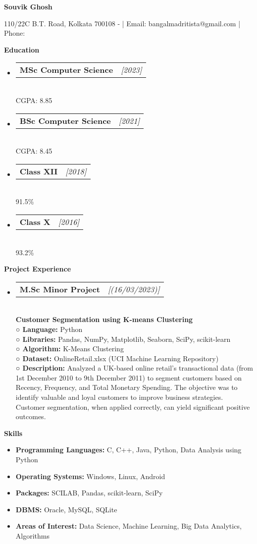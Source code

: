 \documentclass[a4paper,10pt]{article}
\makeatletter
\newcommand{\resitem}[1]{\item #1}
\newcommand{\resheading}[1]{\vspace{0.5em} {\small \colorbox{mygrey}{{\begin{minipage}{0.975\textwidth}{{\textbf{#1}}}\end{minipage}}}} \vspace{0.5em}}
\newcommand{\ressubheading}[3]{\begin{tabular*}{6.62in}{l @{\extracolsep{\fill}} r} \textbf{#1} & \textit{[#2]} \\ \end{tabular*}\vspace{-8pt}}
\makeatother
\begin{document}
\begin{center} \Large{\textbf{Souvik Ghosh}} \end{center}

\vspace{2pt}

\begin{center} 110/22C B.T. Road, Kolkata 700108 - | Email: bangalmadritista@gmail.com | Phone: \end{center}

\resheading{Education}
\begin{itemize}[noitemsep,topsep=0pt]
\resitem{\ressubheading{MSc Computer Science}{2023}{Banaras Hindu University, Varanasi} \\ CGPA: 8.85}
\resitem{\ressubheading{BSc Computer Science}{2021}{Scottish Church College, University of Calcutta, Kolkata} \\ CGPA: 8.45}
\resitem{\ressubheading{Class XII}{2018}{Central Modern School, Council for the Indian School Certificate Examinations} \\ 91.5\%}
\resitem{\ressubheading{Class X}{2016}{Central Modern School, Council for the Indian School Certificate Examinations} \\ 93.2\%}
\end{itemize}

\resheading{Project Experience}
\begin{itemize}[noitemsep,topsep=0pt]
\resitem{\ressubheading{M.Sc Minor Project}{(16/03/2023)}{} \\ \textbf{Customer Segmentation using K-means Clustering} \\ \textbf{○ Language:} Python \\ \textbf{○ Libraries:} Pandas, NumPy, Matplotlib, Seaborn, SciPy, scikit-learn \\ \textbf{○ Algorithm:} K-Means Clustering \\ \textbf{○ Dataset:} OnlineRetail.xlsx (UCI Machine Learning Repository) \\ \textbf{○ Description:} Analyzed a UK-based online retail’s transactional data (from 1st December 2010 to 9th December 2011) to segment customers based on Recency, Frequency, and Total Monetary Spending.  The objective was to identify valuable and loyal customers to improve business strategies.  Customer segmentation, when applied correctly, can yield significant positive outcomes.}
\end{itemize}

\resheading{Skills}
\begin{itemize}[noitemsep,topsep=0pt]
\resitem{\textbf{Programming Languages:} C, C++, Java, Python, Data Analysis using Python}
\resitem{\textbf{Operating Systems:} Windows, Linux, Android}
\resitem{\textbf{Packages:} SCILAB, Pandas, scikit-learn, SciPy}
\resitem{\textbf{DBMS:} Oracle, MySQL, SQLite}
\resitem{\textbf{Areas of Interest:} Data Science, Machine Learning, Big Data Analytics, Algorithms}
\end{itemize}
\end{document}
